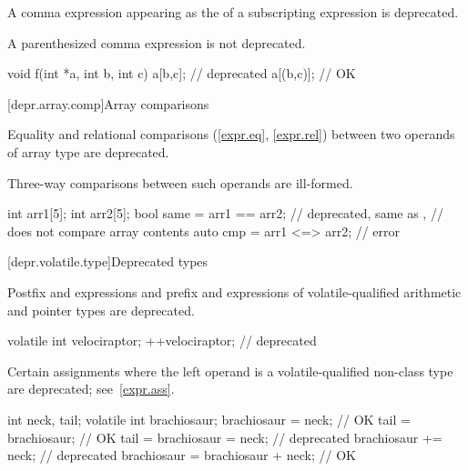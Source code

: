 \pnum
A comma expression
appearing as the 
of a subscripting expression is deprecated.
\begin{note}
A parenthesized comma expression is not deprecated.
\end{note}
\begin{example}
\begin{codeblock}
void f(int *a, int b, int c) {
    a[b,c];                     // deprecated
    a[(b,c)];                   // OK
}
\end{codeblock}
\end{example}

[depr.array.comp]{Array comparisons}

\pnum
Equality and relational comparisons (\ref{expr.eq}, \ref{expr.rel})
between two operands of array type
are deprecated.
\begin{note}
Three-way comparisons between such operands are ill-formed.
\end{note}

\newpage

\begin{example}
\begin{codeblock}
int arr1[5];
int arr2[5];
bool same = arr1 == arr2;       // deprecated, same as ,
                                // does not compare array contents
auto cmp = arr1 <=> arr2;       // error
\end{codeblock}
\end{example}

[depr.volatile.type]{Deprecated  types}

\pnum
Postfix \tcode{++} and \tcode{\dcr} expressions and
prefix \tcode{++} and \tcode{\dcr} expressions
of volatile-qualified arithmetic and pointer types are deprecated.

\begin{example}
\begin{codeblock}
volatile int velociraptor;
++velociraptor;                     // deprecated
\end{codeblock}
\end{example}


\pnum
Certain assignments
where the left operand is a volatile-qualified non-class type
are deprecated; see~\ref{expr.ass}.

\begin{example}
\begin{codeblock}
int neck, tail;
volatile int brachiosaur;
brachiosaur = neck;                 // OK
tail = brachiosaur;                 // OK
tail = brachiosaur = neck;          // deprecated
brachiosaur += neck;                // deprecated
brachiosaur = brachiosaur + neck;   // OK
\end{codeblock}
\end{example}


